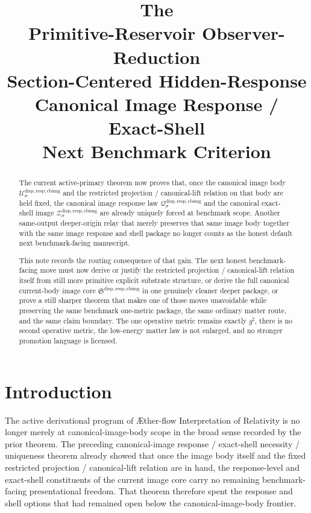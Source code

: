\documentclass[11pt]{article}
\title{\textbf{The \TheoryName{}}\\[0.4em]
\large Primitive-Reservoir Observer-Reduction\\
\large Section-Centered Hidden-Response\\
\large Canonical Image Response / Exact-Shell\\
\large Next Benchmark Criterion}
\author{}
\date{}
\newcommand{\Aflow}{\AE{}ther-flow}
\newcommand{\TheoryName}{\Aflow{} Interpretation of Relativity}
\newcommand{\CompletedMetric}{g^{\sharp}}
\newcommand{\CurrentBodyImageCore}{\mathfrak S^{\mathrm{disp,resp,cbimg}}}
\newcommand{\CanonicalImageBody}[1]{\mathcal U_{#1}^{\mathrm{disp,resp,cbimg}}}
\newcommand{\CanonicalImageShell}[1]{\mathcal Z_{#1}^{\mathrm{disp,resp,cbimg}}}
\newcommand{\CanonicalImageResponseLaw}[1]{\mathscr Q_{#1}^{\mathrm{disp,resp,cbimg}}}
\begin{document}
\maketitle

\begin{abstract}
The current active-primary theorem now proves that, once the canonical image body \(\CanonicalImageBody{\sigma}\) and the restricted projection / canonical-lift relation on that body are held fixed, the canonical image response law \(\CanonicalImageResponseLaw{\sigma}\) and the canonical exact-shell image \(\CanonicalImageShell{\sigma}\) are already uniquely forced at benchmark scope. Another same-output deeper-origin relay that merely preserves that same image body together with the same image response and shell package no longer counts as the honest default next benchmark-facing manuscript.

This note records the routing consequence of that gain. The next honest benchmark-facing move must now derive or justify the restricted projection / canonical-lift relation itself from still more primitive explicit substrate structure, or derive the full canonical current-body image core \(\CurrentBodyImageCore\) in one genuinely cleaner deeper package, or prove a still sharper theorem that makes one of those moves unavoidable while preserving the same benchmark one-metric package, the same ordinary matter route, and the same claim boundary. The one operative metric remains exactly \(\CompletedMetric\), there is no second operative metric, the low-energy matter law is not enlarged, and no stronger promotion language is licensed.
\end{abstract}

\section{Introduction}

The active derivational program of \TheoryName{} is no longer merely at canonical-image-body scope in the broad sense recorded by the prior theorem. The preceding canonical-image response / exact-shell necessity / uniqueness theorem already showed that once the image body itself and the fixed restricted projection / canonical-lift relation are in hand, the response-level and exact-shell constituents of the current image core carry no remaining benchmark-facing presentational freedom. That theorem therefore spent the response and shell options that had remained open below the canonical-image-body frontier.
\end{document}
